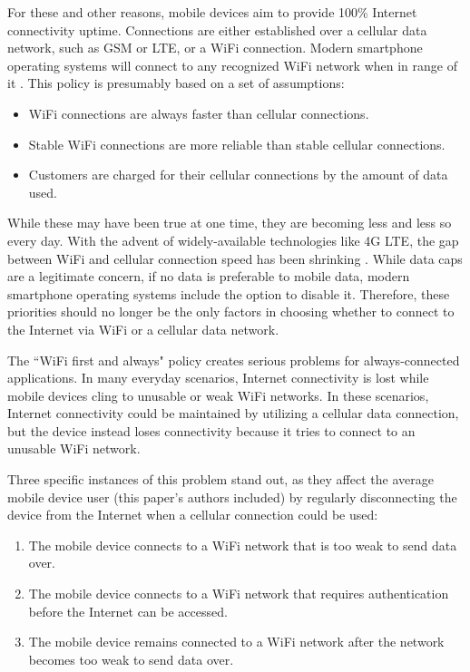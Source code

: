 For these and other reasons, mobile devices aim to provide 100\% Internet connectivity uptime. Connections are either established over a cellular data network, such as GSM or LTE, or a WiFi connection. Modern smartphone operating systems will connect to any recognized WiFi network when in range of it \cite{Google:2013}. This policy is presumably based on a set of assumptions:

\begin{itemize}
\item WiFi connections are always faster than cellular connections.
\item Stable WiFi connections are more reliable than stable cellular connections.
\item Customers are charged for their cellular connections by the amount of data used.
\end{itemize}

While these may have been true at one time, they are becoming less and less so every day. With the advent of widely-available technologies like 4G LTE, the gap between WiFi and cellular connection speed has been shrinking \cite{Huang:2012:CEP:2307636.2307658}. While data caps are a legitimate concern, if no data is preferable to mobile data, modern smartphone operating systems include the option to disable it. Therefore, these priorities should no longer be the only factors in choosing whether to connect to the Internet via WiFi or a cellular data network.

The ``WiFi first and always" policy creates serious problems for always-connected applications. In many everyday scenarios, Internet connectivity is lost while mobile devices cling to unusable or weak WiFi networks. In these scenarios, Internet connectivity could be maintained by utilizing a cellular data connection, but the device instead loses connectivity because it tries to connect to an unusable WiFi network.

Three specific instances of this problem stand out, as they affect the average mobile device user (this paper's authors included) by regularly disconnecting the device from the Internet when a cellular connection could be used:

\begin{enumerate}
\item The mobile device connects to a WiFi network that is too weak to send data over.
\item The mobile device connects to a WiFi network that requires authentication before the Internet can be accessed.
\item The mobile device remains connected to a WiFi network after the network becomes too weak to send data over.
\end{enumerate}

